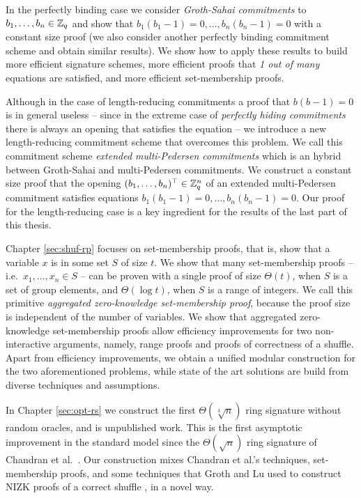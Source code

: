 In the perfectly binding case we consider \emph{Groth-Sahai commitments} to $b_1,\ldots,\allowbreak b_n\allowbreak\in\mathbb{Z}_q$ and show that $b_1(b_1-1)=0,\ldots,b_n(b_n-1)=0$ with a constant size proof (we also consider another perfectly binding commitment scheme and obtain similar results). We show how to apply these results to build more efficient signature schemes, more efficient proofs that \emph{1 out of many} equations are satisfied, and more efficient set-membership proofs.

Although in the case of length-reducing commitments a proof that $b(b-1)=0$ is in general useless -- since in the extreme case of \emph{perfectly hiding commitments} there is always an opening that satisfies the equation -- we introduce a new length-reducing commitment scheme that overcomes this problem. We call this commitment scheme \emph{extended multi-Pedersen commitments} which is an hybrid between Groth-Sahai and multi-Pedersen commitments. We construct a constant size proof that the opening $(b_1,\ldots,b_n)^\top\in\mathbb{Z}_q^n$ of an extended multi-Pedersen commitment satisfies equations $b_1(b_1-1)=0,\ldots,b_n(b_n-1)=0$.
Our proof for the length-reducing case is a key ingredient for the results of the last part of this thesis.
 
Chapter \ref{sec:shuf-rp} focuses on set-membership proofs, that is, show that a variable $x$ is in some set $S$ of size $t$. We show that many set-membership proofs -- i.e.~$x_1,\ldots,x_n\in S$ -- can be proven with a single proof of size $\Theta(t)$, when $S$ is a set of group elements, and $\Theta(\log t)$, when $S$ is a range of integers. We call this primitive \emph{aggregated zero-knowledge set-membership proof}, because the proof size is independent of the number of variables. We show that aggregated zero-knowledge set-membership proofs allow efficiency improvements for two non-interactive arguments, namely, range proofs and proofs of correctness of a shuffle. Apart from efficiency improvements, we obtain a unified modular construction for the two aforementioned problems, while state of the art solutions are build from diverse techniques and assumptions.

In Chapter \ref{sec:opt-rs} we construct the first $\Theta(\sqrt[3]{n})$ ring signature without random oracles, and is unpublished work.
This is the first asymptotic improvement in the standard model since the $\Theta(\sqrt{n})$ ring signature of Chandran et al.~\cite{ICALP:ChaGroSah07}.
Our construction mixes Chandran et al.'s techniques, set-membership proofs, and some techniques that Groth and Lu used to construct NIZK proofs of a correct shuffle \cite{AC:GroLu07}, in a novel way.


